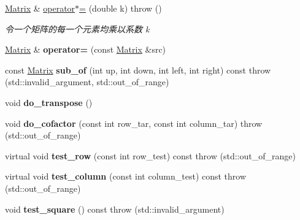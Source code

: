 \begin{DoxyCompactItemize}
\hyperlink{classkerbal_1_1math_1_1_matrix}{Matrix} \& \hyperlink{classkerbal_1_1math_1_1_matrix_a37786e33296ebea6c97d12d1e659a693}{operator$\ast$=} (double k)  throw ()
\begin{DoxyCompactList}\small\item\em 令一个矩阵的每一个元素均乘以系数 k \end{DoxyCompactList}\item 
\mbox{\label{classkerbal_1_1math_1_1_matrix_ac29bf818dcb33bc853ce585fff476943}} 
\hyperlink{classkerbal_1_1math_1_1_matrix}{Matrix} \& {\bfseries operator=} (const \hyperlink{classkerbal_1_1math_1_1_matrix}{Matrix} \&src)
\item 
\mbox{\label{classkerbal_1_1math_1_1_matrix_aba372953226341b1d4492d569e02cb97}} 
const \hyperlink{classkerbal_1_1math_1_1_matrix}{Matrix} {\bfseries sub\+\_\+of} (int up, int down, int left, int right) const  throw (std\+::invalid\+\_\+argument, std\+::out\+\_\+of\+\_\+range)
\item 
\mbox{\label{classkerbal_1_1math_1_1_matrix_a95cba7989eb6db03ffc3062b77380649}} 
void {\bfseries do\+\_\+transpose} ()
\item 
\mbox{\label{classkerbal_1_1math_1_1_matrix_a8c694cdf011ad8cae04c20b55ae24026}} 
void {\bfseries do\+\_\+cofactor} (const int row\+\_\+tar, const int column\+\_\+tar)  throw (std\+::out\+\_\+of\+\_\+range)
\item 
\mbox{\label{classkerbal_1_1math_1_1_matrix_a06ed57fda8ee54bd37a22aa9acdb1497}} 
virtual void {\bfseries test\+\_\+row} (const int row\+\_\+test) const  throw (std\+::out\+\_\+of\+\_\+range)
\item 
\mbox{\label{classkerbal_1_1math_1_1_matrix_a3e7f26fdef23c5e0e6bb60aea37db72f}} 
virtual void {\bfseries test\+\_\+column} (const int column\+\_\+test) const  throw (std\+::out\+\_\+of\+\_\+range)
\item 
\mbox{\label{classkerbal_1_1math_1_1_matrix_ae7a03096165bb72e4c361476f02b2d23}} 
void {\bfseries test\+\_\+square} () const  throw (std\+::invalid\+\_\+argument)
\end{DoxyCompactItemize}
